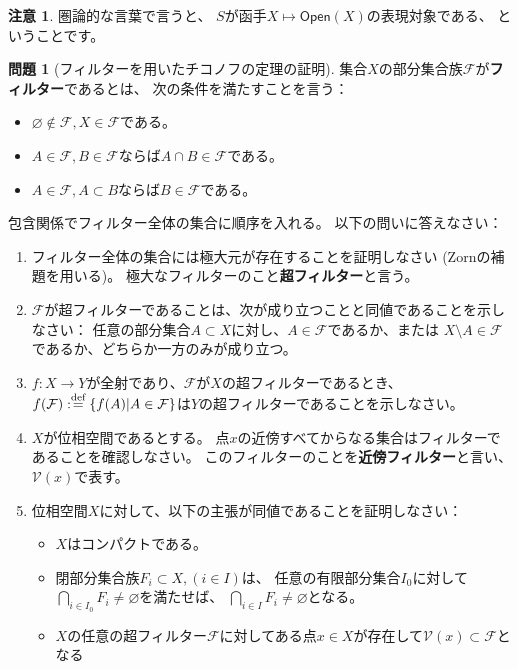 \documentclass[uplatex]{jsarticle}
\theoremstyle{definition}
\newtheorem{prob}[prob]{問題}
\newtheorem*{rem*}{注意}
\renewcommand{\emptyset}{\varnothing}
\newcommand{\dfn}{:\overset{\mbox{{\scriptsize def}}}{=}}
\newcommand{\mcF}{\mathcal{F}}
\newcommand{\mcV}{\mathcal{V}}
\begin{document}
\begin{rem*}
  圏論的な言葉で言うと、
  \(S\)が函手\(X\mapsto \mathsf{Open}(X)\)の表現対象である、
  ということです。
\end{rem*}




\begin{prob}[フィルターを用いたチコノフの定理の証明]\label{Tychonoff}
  集合\(X\)の部分集合族\(\mcF\)が\textbf{フィルター}であるとは、
  次の条件を満たすことを言う：
  \begin{itemize}
    \item \(\emptyset\not\in \mcF, X\in \mcF\)である。
    \item \(A\in \mcF, B\in \mcF\)ならば\(A\cap B\in \mcF\)である。
    \item \(A\in \mcF, A\subset B\)ならば\(B\in \mcF\)である。
  \end{itemize}
  包含関係でフィルター全体の集合に順序を入れる。
  以下の問いに答えなさい：
  \begin{enumerate}
    \item
    フィルター全体の集合には極大元が存在することを証明しなさい
    (Zornの補題を用いる)。
    極大なフィルターのこと\textbf{超フィルター}と言う。
    \item
    \(\mcF\)が超フィルターであることは、次が成り立つことと同値であることを示しなさい：
    任意の部分集合\(A\subset X\)に対し、\(A\in \mcF\)であるか、または
    \(X\setminus A \in \mcF\)であるか、どちらか一方のみが成り立つ。
    \item \label{image filter}
    \(f:X\to Y\)が全射であり、\(\mcF\)が\(X\)の超フィルターであるとき、
    \(f(\mcF)\dfn \{f(A)|A\in \mcF\}\)は\(Y\)の超フィルターであることを示しなさい。
    \item
    \(X\)が位相空間であるとする。
    点\(x\)の近傍すべてからなる集合はフィルターであることを確認しなさい。
    このフィルターのことを\textbf{近傍フィルター}と言い、\(\mcV(x)\)で表す。
    \item \label{cpt filter equiv}
    位相空間\(X\)に対して、以下の主張が同値であることを証明しなさい：
    \begin{itemize}
      \item \(X\)はコンパクトである。
      \item 閉部分集合族\(F_i\subset X,(i\in I)\)は、
      任意の有限部分集合\(I_0\)に対して\(\bigcap_{i\in I_0}F_i \neq \emptyset\)を満たせば、
      \(\bigcap_{i\in I}F_i \neq \emptyset\)となる。
      \item \(X\)の任意の超フィルター\(\mcF\)に対してある点\(x\in X\)が存在して\(\mcV(x)\subset \mcF\)となる

\end{itemize}
\end{enumerate}
\end{prob}
\end{document}
